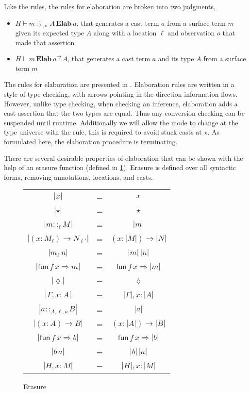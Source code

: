 Like the \bidir{} rules, the rules for elaboration are broken into two judgments,
\begin{itemize}
\item $H\vdash m\overleftarrow{\,:_{\ell,o}\,}A\,\textbf{Elab}\ a$, that generates a cast term $a$ from a surface term $m$ given its expected type $A$ along with a location $\ell$ and observation $o$ that made that assertion
\item $H\vdash m\,\textbf{Elab}\ a\overrightarrow{\,:\,}A$, that generates a cast term $a$ and its type $A$ from a surface term $m$
\end{itemize}
The rules for elaboration are presented in .
Elaboration rules are written in a style of \bidir{} type checking, with arrows pointing in the direction information flows.
However, unlike \bidir{} type checking, when checking an inference, elaboration adds a cast assertion that the two types are equal.
Thus any conversion checking can be suspended until runtime.
Additionally we will allow the mode to change at the type universe with the  rule, this is required to avoid stuck casts at $\star$.
As formulated here, the elaboration procedure is terminating.

There are several desirable properties of elaboration that can be shown with the help of an erasure function (defined in \ref{fig:erasure}).
Erasure is defined over all syntactic forms, removing annotations, locations, and casts.

\begin{figure}
\begin{tabular}{ccc}
$|x|$ & = & $x$\tabularnewline
$|\star|$ & = & $\star$\tabularnewline
$|m::_{\ell}M|$ & = & $|m|$\tabularnewline
$|\left(x:M_{\ell}\right)\rightarrow N_{\ell'}|$ & = & $\left(x:|M|\right)\rightarrow|N|$\tabularnewline
$|m_{\ell}\,n|$ & = & $|m|\,|n|$\tabularnewline
$|\mathsf{fun}\,f\,x\Rightarrow m|$ & = & $\mathsf{fun}\,f\,x\Rightarrow|m|$\tabularnewline
$|\lozenge|$ & = & $\lozenge$\tabularnewline
$|\Gamma,x:A|$ & = & $|\Gamma|,x:|A|$\tabularnewline
$|a::_{A,\ell,o}B|$ & = & $|a|$\tabularnewline
$|\left(x:A\right)\rightarrow B|$ & = & $\left(x:|A|\right)\rightarrow|B|$\tabularnewline
$|\mathsf{fun}\,f\,x\Rightarrow b|$ & = & $\mathsf{fun}\,f\,x\Rightarrow|b|$\tabularnewline
$|b\,a|$ & = & $|b|\,|a|$\tabularnewline
$|H,x:M|$ & = & $|H|,x:|M|$\tabularnewline
\end{tabular}
\caption{Erasure}
\label{fig:erasure}
\end{figure}

